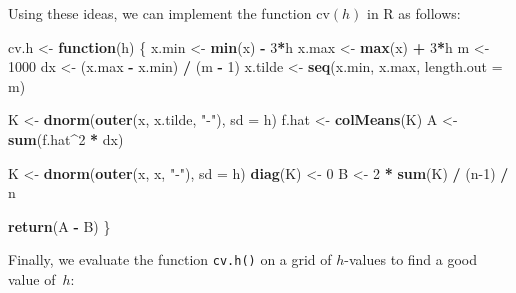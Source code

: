\documentclass[
  a4paper,
]{article}
\newenvironment{Shaded}{\begin{snugshade}}{\end{snugshade}}
\newcommand{\AttributeTok}[1]{\textcolor[rgb]{0.13,0.29,0.53}{#1}}
\newcommand{\ControlFlowTok}[1]{\textcolor[rgb]{0.13,0.29,0.53}{\textbf{#1}}}
\newcommand{\DecValTok}[1]{\textcolor[rgb]{0.00,0.00,0.81}{#1}}
\newcommand{\FunctionTok}[1]{\textcolor[rgb]{0.13,0.29,0.53}{\textbf{#1}}}
\newcommand{\NormalTok}[1]{#1}
\newcommand{\OtherTok}[1]{\textcolor[rgb]{0.56,0.35,0.01}{#1}}
\newcommand{\SpecialCharTok}[1]{\textcolor[rgb]{0.81,0.36,0.00}{\textbf{#1}}}
\newcommand{\StringTok}[1]{\textcolor[rgb]{0.31,0.60,0.02}{#1}}
\theoremstyle{definition}
\theoremstyle{definition}
\theoremstyle{definition}
\theoremstyle{definition}
\theoremstyle{remark}
\begin{document}
Using these ideas, we can implement the function \(\mathrm{cv}(h)\)
in R as follows:

\begin{Shaded}
\begin{Highlighting}[]
\NormalTok{cv.h }\OtherTok{\textless{}{-}} \ControlFlowTok{function}\NormalTok{(h) \{}
\NormalTok{    x.min }\OtherTok{\textless{}{-}} \FunctionTok{min}\NormalTok{(x) }\SpecialCharTok{{-}} \DecValTok{3}\SpecialCharTok{*}\NormalTok{h}
\NormalTok{    x.max }\OtherTok{\textless{}{-}} \FunctionTok{max}\NormalTok{(x) }\SpecialCharTok{+} \DecValTok{3}\SpecialCharTok{*}\NormalTok{h}
\NormalTok{    m }\OtherTok{\textless{}{-}} \DecValTok{1000}
\NormalTok{    dx }\OtherTok{\textless{}{-}}\NormalTok{ (x.max }\SpecialCharTok{{-}}\NormalTok{ x.min) }\SpecialCharTok{/}\NormalTok{ (m }\SpecialCharTok{{-}} \DecValTok{1}\NormalTok{)}
\NormalTok{    x.tilde }\OtherTok{\textless{}{-}} \FunctionTok{seq}\NormalTok{(x.min, x.max, }\AttributeTok{length.out =}\NormalTok{ m)}

\NormalTok{    K }\OtherTok{\textless{}{-}} \FunctionTok{dnorm}\NormalTok{(}\FunctionTok{outer}\NormalTok{(x, x.tilde, }\StringTok{"{-}"}\NormalTok{), }\AttributeTok{sd =}\NormalTok{ h)}
\NormalTok{    f.hat }\OtherTok{\textless{}{-}} \FunctionTok{colMeans}\NormalTok{(K)}
\NormalTok{    A }\OtherTok{\textless{}{-}} \FunctionTok{sum}\NormalTok{(f.hat}\SpecialCharTok{\^{}}\DecValTok{2} \SpecialCharTok{*}\NormalTok{ dx)}

\NormalTok{    K }\OtherTok{\textless{}{-}} \FunctionTok{dnorm}\NormalTok{(}\FunctionTok{outer}\NormalTok{(x, x, }\StringTok{"{-}"}\NormalTok{), }\AttributeTok{sd =}\NormalTok{ h)}
    \FunctionTok{diag}\NormalTok{(K) }\OtherTok{\textless{}{-}} \DecValTok{0}
\NormalTok{    B }\OtherTok{\textless{}{-}} \DecValTok{2} \SpecialCharTok{*} \FunctionTok{sum}\NormalTok{(K) }\SpecialCharTok{/}\NormalTok{ (n}\DecValTok{{-}1}\NormalTok{) }\SpecialCharTok{/}\NormalTok{ n}

    \FunctionTok{return}\NormalTok{(A }\SpecialCharTok{{-}}\NormalTok{ B)}
\NormalTok{\}}
\end{Highlighting}
\end{Shaded}

Finally, we evaluate the function \texttt{cv.h()} on a grid of \(h\)-values
to find a good value of~\(h\):
\end{document}
